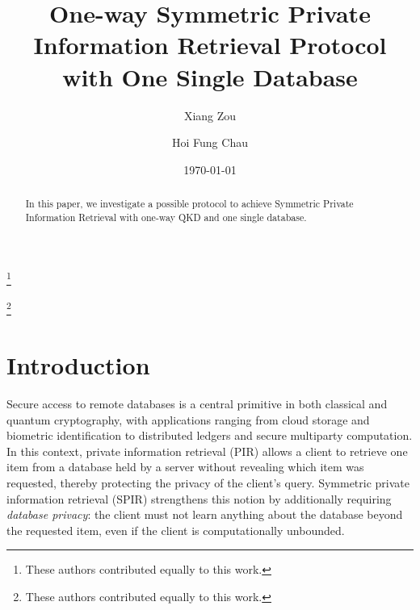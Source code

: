 \documentclass[%
 reprint,
superscriptaddress,
 amsmath,amssymb,
 aps,
]{revtex4-2}
\begin{document}

\title{One-way Symmetric Private Information Retrieval Protocol with One Single Database}%

\author{Xiang Zou}
\thanks{These authors contributed equally to this work.}
%

\author{Hoi Fung Chau}
\thanks{These authors contributed equally to this work.}
%



\date{\today}%

\begin{abstract}
In this paper, we investigate a possible protocol to achieve Symmetric Private Information Retrieval with one-way QKD and one single database.
\end{abstract}

\maketitle


\section{Introduction}

Secure access to remote databases is a central primitive in both classical and quantum cryptography, with applications ranging from cloud storage and biometric identification to distributed ledgers and secure multiparty computation. In this context, private information retrieval (PIR) allows a client to retrieve one item from a database held by a server without revealing which item was requested, thereby protecting the privacy of the client’s query. Symmetric private information retrieval (SPIR) strengthens this notion by additionally requiring \emph{database privacy}: the client must not learn anything about the database beyond the requested item, even if the client is computationally unbounded.%
\end{document}
